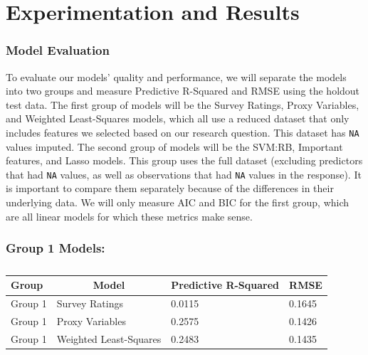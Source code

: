 \documentclass[
  man,floatsintext]{apa6}
\begin{document}
\hypertarget{experimentation-and-results}{%
\section{Experimentation and Results}\label{experimentation-and-results}}

\hypertarget{model-evaluation}{%
\subsubsection{Model Evaluation}\label{model-evaluation}}

To evaluate our models' quality and performance, we will separate the models into two groups and measure Predictive R-Squared and RMSE using the holdout test data. The first group of models will be the Survey Ratings, Proxy Variables, and Weighted Least-Squares models, which all use a reduced dataset that only includes features we selected based on our research question. This dataset has \texttt{NA} values imputed. The second group of models will be the SVM:RB, Important features, and Lasso models. This group uses the full dataset (excluding predictors that had \texttt{NA} values, as well as observations that had \texttt{NA} values in the response). It is important to compare them separately because of the differences in their underlying data. We will only measure AIC and BIC for the first group, which are all linear models for which these metrics make sense.

\hypertarget{group-1-models}{%
\subsubsection{Group 1 Models:}\label{group-1-models}}

\begin{table}[H]

\begin{center}
\begin{threeparttable}

\caption{\label{tab:pred-rsquared-RMSE}}

\begin{tabular}{llll}
\toprule
Group & \multicolumn{1}{c}{Model} & \multicolumn{1}{c}{Predictive R-Squared} & \multicolumn{1}{c}{RMSE}\\
\midrule
Group 1 & Survey Ratings & 0.0115 & 0.1645\\
Group 1 & Proxy Variables & 0.2575 & 0.1426\\
Group 1 & Weighted Least-Squares & 0.2483 & 0.1435\\
\bottomrule
\end{tabular}

\end{threeparttable}
\end{center}

\end{table}
\end{document}
